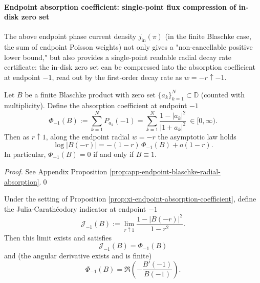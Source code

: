 \paragraph{Endpoint absorption coefficient: single-point flux compression of in-disk zero set}
The above endpoint phase current density \(j_{\mathrm{in}}(\pi)\) (in the finite Blaschke case, the sum of endpoint Poisson weights) not only gives a "non-cancellable positive lower bound," but also provides a single-point readable radial decay rate certificate: the in-disk zero set can be compressed into the absorption coefficient at endpoint \(-1\), read out by the first-order decay rate as \(w=-r\uparrow-1\).

\begin{proposition}\label{prop:xi-endpoint-absorption-coefficient}
Let \(B\) be a finite Blaschke product with zero set \(\{a_k\}_{k=1}^{N}\subset\mathbb{D}\) (counted with multiplicity).
Define the absorption coefficient at endpoint \(-1\)
\[
\Phi_{-1}(B):=\sum_{k=1}^{N}P_{a_k}(-1)=\sum_{k=1}^{N}\frac{1-|a_k|^2}{|1+a_k|^2}\ \in[0,\infty).
\]
Then as \(r\uparrow 1\), along the endpoint radial \(w=-r\) the asymptotic law holds
\[
\log|B(-r)|=-(1-r)\,\Phi_{-1}(B)+o(1-r).
\]
In particular, \(\Phi_{-1}(B)=0\) if and only if \(B\equiv 1\).
\end{proposition}

\begin{proof}
See Appendix Proposition \ref{prop:app-endpoint-blaschke-radial-absorption}.\qed
\end{proof}

\begin{theorem}\label{thm:xi-endpoint-julia-indicator-equals-absorption}
Under the setting of Proposition \ref{prop:xi-endpoint-absorption-coefficient}, define the Julia-Carathéodory indicator at endpoint \(-1\)
\[
\mathcal{J}_{-1}(B):=\lim_{r\uparrow 1}\frac{1-|B(-r)|^2}{1-r^2}.
\]
Then this limit exists and satisfies
\[
\boxed{\;\mathcal{J}_{-1}(B)=\Phi_{-1}(B)\;}
\]
and (the angular derivative exists and is finite)
\[
\boxed{\;\Phi_{-1}(B)=\Re\!\left(-\frac{B'(-1)}{B(-1)}\right).\;}
\]
\end{theorem}

